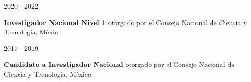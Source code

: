 
\begin{minipage}{1.5 in}
	2020 - 2022\\
\end{minipage}
\begin{minipage}{4.5in}
	\textbf{Investigador Nacional Nivel 1} otorgado por el Consejo Nacional de Ciencia y Tecnología, México\\ 
\end{minipage}


\begin{minipage}{1.5 in}
	2017 - 2019\\
\end{minipage}
\begin{minipage}{4.5in}
	\textbf{Candidato a Investigador Nacional} otorgado por el Consejo Nacional de Ciencia y Tecnología, México\\ 
\end{minipage}

